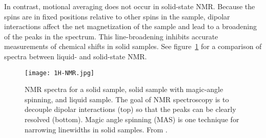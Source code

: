 In contrast, motional averaging does not occur in solid-state NMR. Because the spins are in fixed positions relative to other spins in the sample, dipolar interactions affect the net magnetization of the sample and lead to a broadening of the peaks in the spectrum. This line-broadening inhibits accurate measurements of chemical shifts in solid samples. See figure~\ref{fig:NMR-averaging} for a comparison of spectra between liquid- and solid-state NMR.

\begin{figure}[H]
    \centering
    \texttt{[image: 1H-NMR.jpg]}
    \caption{NMR spectra for a solid sample, solid sample with magic-angle spinning, and liquid sample. The goal of NMR spectroscopy is to decouple dipolar interactions (top) so that the peaks can be clearly resolved (bottom). Magic angle spinning (MAS) is one technique for narrowing linewidths in solid samples. From \cite{Ottowa-NMR}.}
    \label{fig:NMR-averaging}
\end{figure}





%
%



